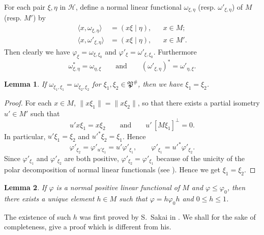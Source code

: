 \documentclass[12pt,b5paper,twoside]{article}
\theoremstyle{takesaki}
\newtheorem{lemma}{Lemma}[section]
\numberwithin{equation}{section}
\begin{document}
For each pair $\xi,\eta$ in $\mathcal H$, define a normal linear
functional $\omega_{\xi,\eta}$ (resp. $\omega'_{\xi,\eta}$) of $M$
(resp. $M'$) by
\begin{equation}
  \begin{aligned}
    \langle x,\omega_{\xi,\eta}\rangle&=(x\xi\mid\eta), &&x\in M;\\
    \langle x,\omega'_{\xi,\eta}\rangle&=(x\xi\mid\eta), &&x\in M'.
  \end{aligned}
  \label{eq:15.4}
\end{equation}
Then clearly we have
$\varphi_{\xi}=\omega_{\xi,\xi_0}$ and
$\varphi'_{\xi}=\omega'_{\xi,\xi_0}$.  Furthermore
\[
  \omega_{\xi,\eta}^{*}=\omega_{\eta,\xi}
  \qquad\text{and}\qquad
  (\omega'_{\xi,\eta})^{*}=\omega'_{\eta,\xi}.
\]

\begin{lemma}
\label{lem:15.3}
If $\omega_{\xi_1,\xi_1}=\omega_{\xi_2,\xi_2}$ for
$\xi_1,\xi_2\in\mathfrak P^{\#}$, then we have $\xi_1=\xi_2$.
\end{lemma}

\begin{proof}
For each $x\in M$, $\lVert x\xi_1\rVert=\lVert x\xi_2\rVert$, so that
there exists a partial isometry $u'\in M'$ such that
\[
  u'x\xi_1=x\xi_2
  \qquad\text{and}\qquad
  u'\,[M\xi_1]^{\perp}=0.
\]
In particular, $u'\xi_1=\xi_2$ and $u'^*\xi_2=\xi_1$.  Hence
\[
  \varphi'_{\xi_2}=\varphi'_{u'\xi_1}=u'\varphi'_{\xi_1},
  \qquad
  \varphi'_{\xi_1}=u'^*\varphi'_{\xi_2}.
\]
Since $\varphi'_{\xi_1}$ and $\varphi'_{\xi_2}$ are both positive,
$\varphi'_{\xi_2}=\varphi'_{\xi_1}$ because of the unicity of the polar
decomposition of normal linear functionals (see
\cite[Theorem~4, p.~61]{ref3}).  Hence we get $\xi_1=\xi_2$.
\end{proof}

\begin{lemma}
\label{lem:15.4}
If $\varphi$ is a normal positive linear functional of $M$ and
$\varphi\leq\varphi_0$, then there exists a unique element $h\in M$ such
that $\varphi=h\varphi_0h$ and $0\leq h\leq1$.
\end{lemma}

The existence of such $h$ was first proved by S.~Sakai in \cite{ref16}.
We shall for the sake of completeness, give a proof which is different
from his.
\end{document}
